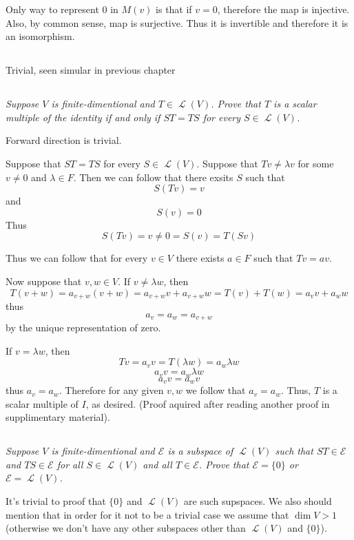 \documentclass[11pt,oneside,titlepage]{book}
\DeclareMathOperator \map {\mathcal {L}}
\begin{document}
Only way to represent 0 in $M(v)$ is that if $v = 0$, therefore the map is injective. Also,
by common sense, map is surjective. Thus it is invertible and therefore it is an isomorphism.

\subsection{}

Trivial, seen simular in previous chapter

\subsection{}

\textit{Suppose $V$ is finite-dimentional and $T \in \map(V)$. Prove that $T$ is a scalar
  multiple of the identity if and only if $ST = TS$ for every $S \in \map (V)$.}

Forward direction is trivial.

Suppose that $ST = TS$ for every $S \in \map(V)$. Suppose that $Tv \neq \lambda v$ for some
$v \neq 0$ and $\lambda \in F$. Then we can follow that there exsits $S$ such that
$$S(Tv) = v$$
and
$$S(v) = 0$$
Thus
$$ S (Tv) = v \neq 0 = S(v) = T(Sv)$$

Thus we can follow that for every $v \in V$ there exists $a \in F$ such that $Tv = av$.

Now suppose that $v, w \in V$. If $v \neq \lambda w$, then
$$T(v + w) = a_{v + w}(v + w) = a_{v + w}v + a_{v + w}w = T(v) + T(w) = a_v v + a_w w$$
thus
$$a_v = a_w = a_{v + w}$$
by the unique representation of zero.

If $v = \lambda w$,  then
$$Tv = a_v v = T(\lambda w) = a_w \lambda w$$
$$a_v v =  a_w \lambda w$$
$$a_v v =  a_w v$$
thus $a_v = a_w$. Therefore for any given $v, w$ we follow that $a_v = a_w$. Thus, $T$ is a
scalar multiple of $I$, as desired. (Proof aquired after reading another proof in supplimentary
material).

\subsection{}

\textit{Suppose $V$ is finite-dimentional and $\mathcal E$ is a subspace of $\map(V)$ such
  that $ST \in  \mathcal E$ and $TS \in \mathcal E$ for all $S \in \map(V)$ and all
  $T \in \mathcal E$. Prove that $\mathcal E  = \{0\}$ or $\mathcal E = \map(V)$.}

It's trivial to proof that $\{0\}$ and $\map(V)$ are such supspaces. We also should
mention that in order for it not to be a trivial case we assume that $\dim V > 1$ (otherwise
we don't have any other subspaces other than $\map (V)$ and $\{0\}$).
\end{document}
